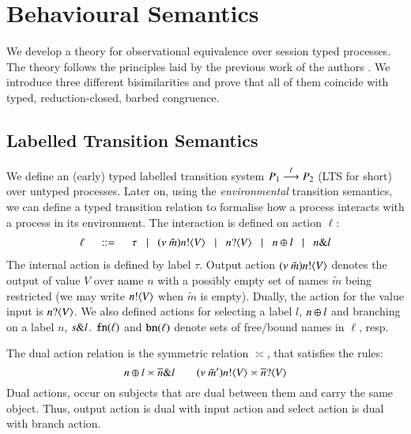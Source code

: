 \section{Behavioural Semantics}
\label{sec:beh_sem}

\noi We develop a theory for observational equivalence over
session typed \HOp processes.
The theory follows the principles laid by the previous
work of the authors \cite{KYHH2015,KY2015,dkphdthesis}.
We introduce three different bisimilarities and prove
that
all of them coincide with typed, reduction-closed,
barbed congruence. 

\subsection{Labelled Transition Semantics}
\label{subsec:lts}

We define an (early) typed labelled transition system
$P_1 \stackrel{\ell}{\longrightarrow} P_2$ (LTS for short) over
untyped processes.
Later on, using the \emph{environmental} transition semantics, 
we can define a typed transition relation to formalise 
how a process interacts with a process in its environment.
The interaction
is defined on action $\ell$:
%
\[
	\begin{array}{rcl}
		\ell	& \;\;::=\;\;  & \tau 
		\;\;\;|\;\;\; (\nu\ \tilde{m}) n ! \langle V \rangle 
		\;\;\;|\;\;\;n ? \langle V \rangle 
		\;\;\;|\;\;\; n \oplus l 
		\;\;\;|\;\;\; n \& l 
	\end{array}
\]
%
\noi The internal action is defined by label $\tau$.
Output action $(\nu\ \tilde{m}) n ! \langle V \rangle$ denotes the output of value
$V$ over name $n$ with a possibly empty set of names $\tilde{m}$
being restricted (we may write $n ! \langle V \rangle$  when $\tilde{m}$ is empty).
Dually, the action for the value input is $n ? \langle V \rangle$.
We also defined actions for selecting a label
$l$, $n \oplus l$ and branching on a label
$n$, $s \& l$.
$\mathtt{fn}(\ell)$ and $\mathtt{bn}(\ell)$ denote 
sets of free/bound names in $\ell$, resp.

The dual action relation is the symmetric relation $\asymp$, that satisfies the rules:
%
\[
	n \oplus l \asymp \overline{n} \& l
	\qquad
	(\nu\ \tilde{m}') n ! \langle V \rangle \asymp \overline{n} ? \langle V \rangle
\]
%
Dual actions, occur on subjects that are dual between
them and carry the same object. Thus,
output action is dual with input action and 
select action is dual with branch action.



